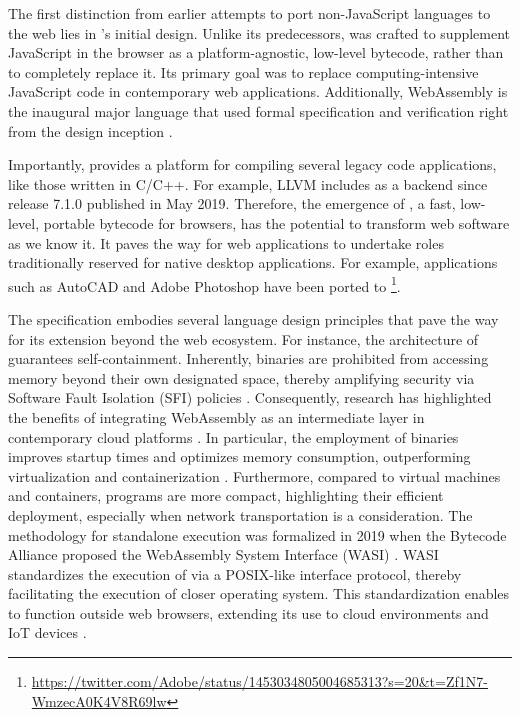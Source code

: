 The first distinction from earlier attempts to port non-JavaScript languages to the web lies in \Wasm's initial design. 
Unlike its predecessors, \Wasm was crafted to supplement JavaScript in the browser as a platform-agnostic, low-level bytecode, rather than to completely replace it. 
Its primary goal was to replace computing-intensive JavaScript code in contemporary web applications. 
Additionally, WebAssembly is the inaugural major language that used formal specification and verification right from the design inception \cite{Haas_2017, watt2018mechanising}. 


Importantly, \Wasm provides a platform for compiling several legacy code applications, like those written in C/C++. 
For example, LLVM includes \Wasm as a backend since release 7.1.0 published in May 2019.
Therefore, the emergence of \Wasm, a fast, low-level, portable bytecode for browsers, has the potential to transform web software as we know it. 
It paves the way for web applications to undertake roles traditionally reserved for native desktop applications.
For example, applications such as AutoCAD and Adobe Photoshop have been ported to \Wasm \footnote{\url{https://twitter.com/Adobe/status/1453034805004685313?s=20&t=Zf1N7-WmzecA0K4V8R69lw}}. 


The \Wasm specification embodies several language design principles that pave the way for its extension beyond the web ecosystem.
For instance, the architecture of \Wasm guarantees self-containment.
Inherently, \Wasm binaries are prohibited from accessing memory beyond their own designated space, thereby amplifying security via Software Fault Isolation (SFI)  policies \cite{gobi}.
Consequently, research has highlighted the benefits of integrating WebAssembly as an intermediate layer in contemporary cloud platforms \cite{pMendkiServerless}.
In particular, the employment of \Wasm binaries improves startup times and optimizes memory consumption, outperforming virtualization and containerization \cite{1244493Jacobsson}.
Furthermore, compared to virtual machines and containers, \Wasm programs are more compact, highlighting their efficient deployment, especially when network transportation is a consideration.
The methodology for standalone \Wasm execution was formalized in 2019 when the Bytecode Alliance proposed the WebAssembly System Interface (WASI) .
WASI standardizes the execution of \Wasm via a POSIX-like interface protocol, thereby facilitating the execution of \Wasm closer operating system.
This standardization enables \Wasm to function outside web browsers, extending its use to cloud environments and IoT devices \cite{10.1145/3526059.3533618, 10.1145/3572848.3577436}.

